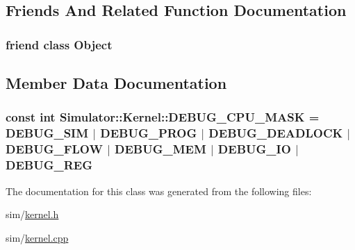 \subsection{Friends And Related Function Documentation}
\hypertarget{class_simulator_1_1_kernel_a0720b5f434e636e22a3ed34f847eec57}{
\subsubsection[{Object}]{\setlength{\rightskip}{0pt plus 5cm}friend class {\bf Object}\hspace{0.3cm}{\ttfamily [friend]}}}\label{class_simulator_1_1_kernel_a0720b5f434e636e22a3ed34f847eec57}


\subsection{Member Data Documentation}
\hypertarget{class_simulator_1_1_kernel_a18dcad4f90063352a7815039fc00cb64}{
\subsubsection[{D\+E\+B\+U\+G\+\_\+\+C\+P\+U\+\_\+\+M\+A\+S\+K}]{\setlength{\rightskip}{0pt plus 5cm}const int Simulator\+::\+Kernel\+::\+D\+E\+B\+U\+G\+\_\+\+C\+P\+U\+\_\+\+M\+A\+S\+K = {\bf D\+E\+B\+U\+G\+\_\+\+S\+I\+M} $\vert$ {\bf D\+E\+B\+U\+G\+\_\+\+P\+R\+O\+G} $\vert$ {\bf D\+E\+B\+U\+G\+\_\+\+D\+E\+A\+D\+L\+O\+C\+K} $\vert$ {\bf D\+E\+B\+U\+G\+\_\+\+F\+L\+O\+W} $\vert$ {\bf D\+E\+B\+U\+G\+\_\+\+M\+E\+M} $\vert$ {\bf D\+E\+B\+U\+G\+\_\+\+I\+O} $\vert$ {\bf D\+E\+B\+U\+G\+\_\+\+R\+E\+G}\hspace{0.3cm}{\ttfamily [static]}}}\label{class_simulator_1_1_kernel_a18dcad4f90063352a7815039fc00cb64}


The documentation for this class was generated from the following files\+:\begin{DoxyCompactItemize}
\item 
sim/\hyperlink{kernel_8h}{kernel.\+h}\item 
sim/\hyperlink{kernel_8cpp}{kernel.\+cpp}\end{DoxyCompactItemize}
